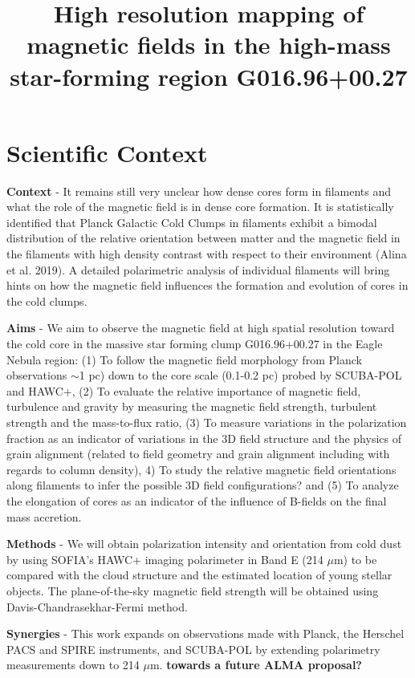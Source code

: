 \documentclass[11pt]{amsart}
\title{High resolution mapping of magnetic fields in the high-mass star-forming region  G016.96+00.27}
\begin{document}
\maketitle


\section{Scientific Context}
{\bf Context} - It remains still very unclear how dense cores form in filaments and what the role of the  magnetic field is in dense core formation. 
It is statistically identified that Planck Galactic Cold Clumps in filaments exhibit a bimodal distribution of the relative orientation between matter and the magnetic field in the filaments with high density contrast with respect to their environment (Alina et al. 2019).  A detailed polarimetric analysis of individual filaments will bring hints on how the magnetic field influences the formation and evolution of cores in the cold clumps.


{\bf Aims} - We aim to observe the magnetic field at high spatial resolution toward the 
cold core in the massive star forming clump G016.96+00.27 in the Eagle Nebula region:
(1) To follow the magnetic field morphology from Planck observations $\sim$1 pc) down to the core scale (0.1-0.2 pc) probed by SCUBA-POL and HAWC+, 
(2) To evaluate the relative importance of magnetic field, turbulence and gravity by measuring the magnetic field strength, turbulent strength and the mass-to-flux ratio, 
(3) To measure variations in the polarization fraction 
as an indicator of variations in the 3D field structure and the physics of grain alignment (related to field geometry and grain alignment including with regards to column density),  
4) To study the relative magnetic field orientations along filaments to infer the possible 3D field configurations?
and 
(5) To analyze the elongation of cores 
as an indicator of the influence of B-fields on the final mass accretion.

{\bf Methods} - 
We will obtain polarization intensity and orientation from cold dust by using SOFIA's HAWC+ imaging polarimeter in Band E (214 $\mu$m) to be compared with the cloud structure and the 
estimated location of young stellar objects. The plane-of-the-sky magnetic field strength will be obtained using Davis-Chandrasekhar-Fermi method. 

{\bf Synergies} - This work expands on observations made with Planck, the Herschel PACS and SPIRE instruments, and SCUBA-POL by extending polarimetry measurements down to 214 $\mu$m. 
{\bf towards a future ALMA proposal?}
\end{document}
